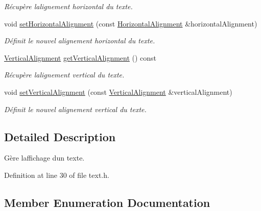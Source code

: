 \begin{DoxyCompactItemize}
\begin{DoxyCompactList}\small\item\em Récupère l\textquotesingle{}alignement horizontal du texte. \end{DoxyCompactList}\item 
void \hyperlink{classns_gui_1_1_text_a952d6bb9e10c33aa446ff17fd73944a9}{set\+Horizontal\+Alignment} (const \hyperlink{classns_gui_1_1_text_a78bb37c174a4f37eec2b7d69459ee7dc}{Horizontal\+Alignment} \&horizontal\+Alignment)
\begin{DoxyCompactList}\small\item\em Définit le nouvel alignement horizontal du texte. \end{DoxyCompactList}\item 
\hyperlink{classns_gui_1_1_text_a3b0b5071a55982d5612c457a832f80fa}{Vertical\+Alignment} \hyperlink{classns_gui_1_1_text_a5118089a93160dde9fb85f2b4b32a5e1}{get\+Vertical\+Alignment} () const
\begin{DoxyCompactList}\small\item\em Récupère l\textquotesingle{}alignement vertical du texte. \end{DoxyCompactList}\item 
void \hyperlink{classns_gui_1_1_text_a5b0a3b1a3d31129f2d8aa32b58ea2f8a}{set\+Vertical\+Alignment} (const \hyperlink{classns_gui_1_1_text_a3b0b5071a55982d5612c457a832f80fa}{Vertical\+Alignment} \&vertical\+Alignment)
\begin{DoxyCompactList}\small\item\em Définit le nouvel alignement vertical du texte. \end{DoxyCompactList}\end{DoxyCompactItemize}


\subsection{Detailed Description}
Gère l\textquotesingle{}affichage d\textquotesingle{}un texte. 

Definition at line 30 of file text.\+h.



\subsection{Member Enumeration Documentation}
\mbox{\label{classns_gui_1_1_text_a78bb37c174a4f37eec2b7d69459ee7dc}} 
